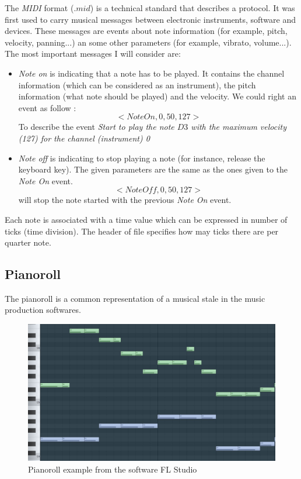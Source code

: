 \documentclass[12pt]{report}
\begin{document}

The \textit{MIDI} format ($.mid$) is a technical standard that describes a protocol.
It was first used to carry musical messages between electronic instruments, software and devices. These messages are events about note information (for example, pitch, velocity, panning...) an some other parameters (for example, vibrato, volume...). 
The most important messages I will consider are:
\begin{itemize}
    \item \textit{Note on} is indicating that a note has to be played. It contains the channel information (which can be considered as an instrument), the pitch information (what note should be played) and the velocity. We could right an event as follow :
    \begin{equation}
        <NoteOn, 0, 50, 127>
    \end{equation}
    To describe the event \textit{Start to play the note $D3$ with the maximum velocity (127) for the channel (instrument) 0}
    \item \textit{Note off} is indicating to stop playing a note (for instance, release the keyboard key). The given parameters are the same as the ones given to the \textit{Note On} event.
    \begin{equation}
        <NoteOff, 0, 50, 127>
    \end{equation}
    will stop the note started with the previous \textit{Note On} event.
\end{itemize}

Each note is associated with a time value which can be expressed in number of ticks (time division). The header of file specifies how may ticks there are per quarter note.

\subsection{Pianoroll}

The pianoroll is a common representation of a musical stale in the music production softwares.

\begin{figure}[H]
    \centering
    \includegraphics[width=0.75 \textwidth]{images/music/pianoroll/pianoroll_flstudio.jpg}
    \caption{Pianoroll example from the software FL Studio \cite{noauthor_fl_nodate}}
    \label{fig:pianoroll_flstudio}
\end{figure}
\end{document}
